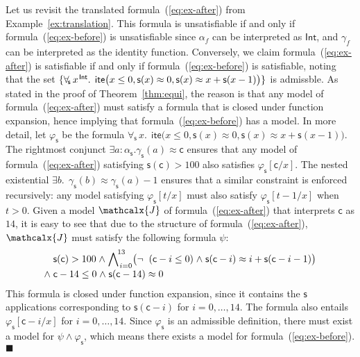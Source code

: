 \documentclass[runningheads,a4paper]{llncs}
\newcommand{\con}[1]{\mathsf{#1}}
\let\oldneg=\neg
\def\neg{\oldneg\;}
\let\oldwedge=\wedge
\def\wedge{\mathrel{\oldwedge}}
\newcommand{\teq}{\approx}
\newcommand{\I}{\mathcalx{J}} %
\newcommand{\sortint}{\ty{Int}}
\newcommand\ty[1]{\con{#1}}
\newcommand{\lite}{\con{ite}}
\newcommand\concret{\gamma} %
\newcommand{\forallf}[1]{\forall_{\!#1\:}}
\newcommand{\farg}[1]{\concret_{#1}}
\newcommand{\fargsort}[1]{\alpha_{#1}}
\newcommand{\vthinspace}{\kern+0.083333em}
\newcommand{\typ}[1]{^{\vthinspace #1}}
\newcommand\xend{{\hfill$\scriptstyle\blacksquare$}}
\begin{document}
\begin{example}
Let us revisit the translated formula~(\ref{eq:ex-after}) from
Example~\ref{ex:translation}. This formula is unsatisfiable if and only if
formula~(\ref{eq:ex-before}) is unsatisfiable since $\fargsort{f}$ can be
interpreted as $\sortint$, and $\farg{f}$ can be interpreted as the identity
function. Conversely, we claim formula~(\ref{eq:ex-after}) is satisfiable if
and only if formula~(\ref{eq:ex-before}) is satisfiable, noting that the set
$\{ \forallf{\con{s}} x\typ{\sortint}.\;\, \lite\bigl( x \leq 0, \con{s}(x)
\teq 0, \con{s}( x ) \teq x + \con{s}( x-1 ) \bigr) \}$ is admissble.
As stated
in the proof of Theorem~\ref{thm:equi}, the reason is that any model of
formula~(\ref{eq:ex-after}) must satisfy a formula that is closed under
function expansion, hence implying that formula~(\ref{eq:ex-before}) has a
model. In more detail, let $\varphi_\con{s}$ be the formula $\forallf{\con{s}} x.\;\,
\lite\bigl( x \leq 0, \con{s}(x) \teq 0, \con{s}( x ) \teq x + \con{s}( x-1 )
\bigr)$. The rightmost conjunct $\exists a : {\fargsort{\con{s}}}.
\farg{\con{s}}( a ) \teq \con{c}$ ensures that any model of
formula~(\ref{eq:ex-after}) satisfying $\con{s}( \con{c} ) > 100$ also
satisfies $\varphi_{\con{s}}[\con{c}/x]$. The nested existential
$\exists b.\;\, \farg{\con{s}}( b ) \teq \farg{\con{s}}( a )-1$ ensures that
a similar constraint is enforced recursively: any model satisfying $\varphi_{\con{s}}[t/x]$
must also satisfy $\varphi_{\con{s}}[t-1/x]$ when $t > 0$. Given a model $\I$ of
formula~(\ref{eq:ex-after}) that interprets $\con{c}$ as $14$, it is easy to see that
due to the structure of formula~(\ref{eq:ex-after}),
$\I$ must satisfy the following formula $\psi$:
%
\begin{equation} \label{eq:fun-closure}
\begin{split}
& \con{s}( \con{c} ) > 100 \wedge %
  \bigwedge\nolimits_{\vthinspace i=0}^{\!13} \bigl( \neg (\con{c}-i \leq 0) \wedge \con{s}( \con{c}-i ) \teq i + \con{s}( \con{c}-i-1 ) \bigr) \\[-\jot]
{\wedge}\; & \con{c}-14 \leq 0 \wedge \con{s}( \con{c}-14 ) \teq 0
\end{split}
\end{equation}
%
This formula is closed under function expansion,
since it contains the $\con{s}$ applications corresponding to
$\con{s}( \con{c}-i )$ for $i = 0, \ldots, 14$. The formula also
entails $\varphi_\con{s}[\con{c}-i/x]$ for $i = 0, \ldots, 14$.
Since $\varphi_\con{s}$ is an admissible definition,
there must exist a model for $\psi \wedge \varphi_\con{s}$,
which means there exists a model for formula~(\ref{eq:ex-before}).\xend
\end{example}
\end{document}
